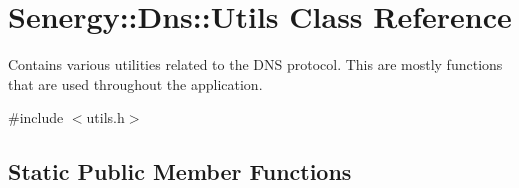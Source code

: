 \hypertarget{class_senergy_1_1_dns_1_1_utils}{\section{Senergy\-:\-:Dns\-:\-:Utils Class Reference}
\label{class_senergy_1_1_dns_1_1_utils}
}


Contains various utilities related to the D\-N\-S protocol. This are mostly functions that are used throughout the application.  




{\ttfamily \#include $<$utils.\-h$>$}

\subsection*{Static Public Member Functions}
